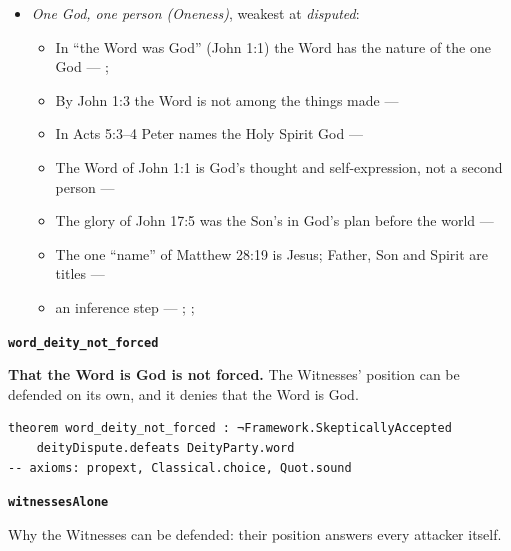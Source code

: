 \documentclass[11pt,paper=\testimonypaper,DIV=13,parskip=false]{scrartcl}
\begin{document}
\begin{itemize}
\begin{itemize}
\item In Matthew 28:19 three are named, and the one name is theirs together --- \cite[3, The Triune God]{kibbey-living-systematic-theology-2026}
\end{itemize}
\item \emph{One God, one person (Oneness)}, weakest at \emph{disputed}:
\begin{itemize}
\item In “the Word was God” (John 1:1) the Word has the nature of the one God --- \cite{harner-qualitative-anarthrous-1973}; \cite[3, The Triune God]{kibbey-living-systematic-theology-2026}
\item By John 1:3 the Word is not among the things made --- \cite[Tractates on John I.11]{schaff-nicene-post-nicene-fathers-1-7}
\item In Acts 5:3–4 Peter names the Holy Spirit God --- \cite[198]{calvin-commentary-acts-1844}
\item The Word of John 1:1 is God’s thought and self-expression, not a second person --- \cite[ch. 4 and 8, on John 1:1]{bernard-oneness-of-god-1983}
\item The glory of John 17:5 was the Son’s in God’s plan before the world --- \cite[ch. 8, The Preexistence of Jesus]{bernard-oneness-of-god-1983}
\item The one “name” of Matthew 28:19 is Jesus; Father, Son and Spirit are titles --- \cite[ch. 6, Matthew 28:19]{bernard-oneness-of-god-1983}
\item an inference step --- \cite[3, The Triune God]{kibbey-living-systematic-theology-2026}; \cite[ch. 4, Conclusion]{bernard-oneness-of-god-1983}; \cite[17--19]{buzzard-caveat-lector-2001}
\end{itemize}
\end{itemize}
\par\medskip\noindent\textbf{\texttt{word\_\allowbreak{}deity\_\allowbreak{}not\_\allowbreak{}forced}}\par\nobreak\noindent
\textbf{That the Word is God is not forced.} The Witnesses’ position can be defended on its own, and it denies that the Word is God.

{\small\begin{verbatim}
theorem word_deity_not_forced : ¬Framework.SkepticallyAccepted
    deityDispute.defeats DeityParty.word
-- axioms: propext, Classical.choice, Quot.sound
\end{verbatim}}
\par\medskip\noindent\textbf{\texttt{witnesses\allowbreak{}Alone}}\par\nobreak\noindent
Why the Witnesses can be defended: their position answers every attacker itself.
\end{document}
